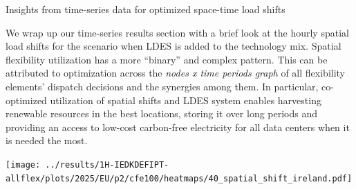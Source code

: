 \begin{frame}{Insights from time-series data for optimized space-time load shifts}
\label{timeseries-p2}

  {\footnotesize

  \vspace{-0.1cm}
  We wrap up our time-series results section with a brief look at the \alert{hourly spatial load shifts} for the scenario when LDES is added to the technology mix. Spatial flexibility utilization has a more \enquote{binary} and complex pattern. This can be attributed to optimization across the \textit{nodes x time periods graph} of all flexibility elements' dispatch decisions and the synergies among them. In particular, co-optimized utilization of spatial shifts and LDES system enables harvesting renewable resources in the best locations, storing it over long periods and providing an access to low-cost carbon-free electricity for all data centers when it is needed the most. 

  \texttt{[image: ../results/1H-IEDKDEFIPT-allflex/plots/2025/EU/p2/cfe100/heatmaps/40\_spatial\_shift\_ireland.pdf]}
  }
  
\end{frame}



